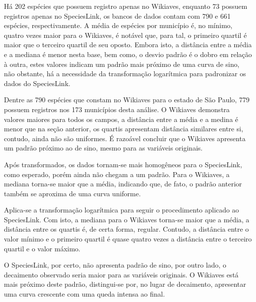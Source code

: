 \documentclass[12pt]{extarticle}
\newenvironment{resposta}{ \color{mygray}}{}
\begin{document}
\begin{resposta}
Há 202 espécies que possuem registro apenas no Wikiaves, enquanto 73 possuem registros apenas no SpeciesLink, os bancos de dados contam com 790 e 661 espécies, respectivamente. A média de espécies por município é, no mínimo, quatro vezes maior para o Wikiaves, é notável que, para tal, o primeiro quartil é maior que o terceiro quartil de seu oposto. Embora isto, a distância entre a média e a mediana é menor nesta base, bem como, o desvio padrão é o dobro em relação à outra, estes valores indicam um padrão mais próximo de uma curva de sino, não obstante, há a necessidade da transformação logarítmica para padronizar os dados do SpeciesLink.

Dentre as 790 espécies que constam no Wikiaves para o estado de São Paulo, 779 possuem registros nos 173 municípios desta análise. O Wikiaves demonstra valores maiores para todos os campos, a distância entre a média e a medina é menor que na seção anterior, os quartis apresentam distância similares entre si, contudo, ainda não são uniformes. É razoável concluir que o Wikiaves apresenta um padrão próximo ao de sino, mesmo para as variáveis originais.

Após transformados, os dados tornam-se mais homogêneos para o SpeciesLink, como esperado, porém ainda não chegam a um padrão. Para o Wikiaves, a mediana torna-se maior que a média, indicando que, de fato, o padrão anterior também se aproxima de uma curva uniforme.

Aplica-se a transformação logarítmica para seguir o procedimento aplicado ao SpeciesLink. Com isto, a mediana para o Wikiaves torna-se maior que a média, a distância entre os quartis é, de certa forma, regular. Contudo, a distância entre o valor mínimo e o primeiro quartil é quase quatro vezes a distância entre o terceiro quartil e o valor máximo.

O SpeciesLink, por certo, não apresenta padrão de sino, por outro lado, o decaimento observado seria maior para as variáveis originais. O Wikiaves está mais próximo deste padrão, distingui-se por, no lugar de decaimento, apresentar uma curva crescente com uma queda intensa ao final.
\end{resposta}
\end{document}
